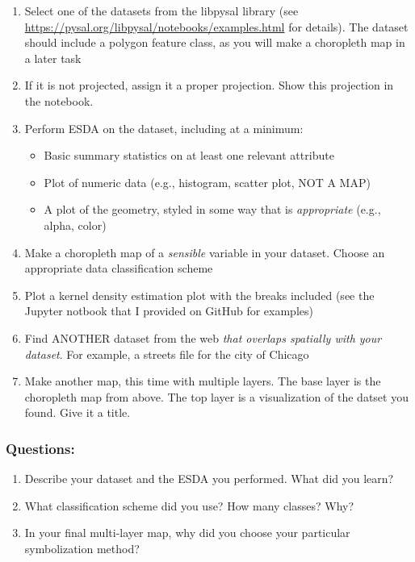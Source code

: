 \documentclass[]{article}
\providecommand{\tightlist}{%
  \setlength{\itemsep}{0pt}\setlength{\parskip}{0pt}}
\begin{document}
\begin{enumerate}
\def\labelenumi{\arabic{enumi}.}
\item
  Select one of the datasets from the libpysal library (see
  \url{https://pysal.org/libpysal/notebooks/examples.html} for details).
  The dataset should include a polygon feature class, as you will make a
  choropleth map in a later task
\item
  If it is not projected, assign it a proper projection. Show this
  projection in the notebook.
\item
  Perform ESDA on the dataset, including at a minimum:

  \begin{itemize}
  \tightlist
  \item
    Basic summary statistics on at least one relevant attribute
  \item
    Plot of numeric data (e.g., histogram, scatter plot, NOT A MAP)
  \item
    A plot of the geometry, styled in some way that is
    \emph{appropriate} (e.g., alpha, color)
  \end{itemize}
\item
  Make a choropleth map of a \emph{sensible} variable in your dataset.
  Choose an appropriate data classification scheme
\item
  Plot a kernel density estimation plot with the breaks included (see
  the Jupyter notbook that I provided on GitHub for examples)
\item
  Find ANOTHER dataset from the web \emph{that overlaps spatially with
  your dataset}. For example, a streets file for the city of Chicago
\item
  Make another map, this time with multiple layers. The base layer is
  the choropleth map from above. The top layer is a visualization of the
  datset you found. Give it a title.
\end{enumerate}

\hypertarget{questions}{%
\subsubsection{Questions:}\label{questions}}

\begin{enumerate}
\def\labelenumi{\arabic{enumi}.}
\item
  Describe your dataset and the ESDA you performed. What did you learn?
\item
  What classification scheme did you use? How many classes? Why?
\item
  In your final multi-layer map, why did you choose your particular
  symbolization method?
\end{enumerate}
\end{document}
